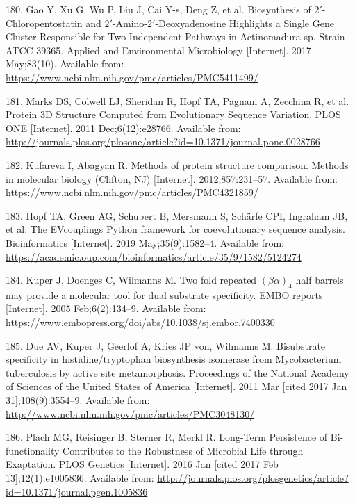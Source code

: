 \documentclass[12pt,twoside]{reedthesis}
\begin{document}
  \hypertarget{ref-gao_biosynthesis_2017}{}
  180. Gao Y, Xu G, Wu P, Liu J, Cai Y-s, Deng Z, et al. Biosynthesis of
  \(2\prime\)-Chloropentostatin and
  \(2\prime\)-Amino-\(2\prime\)-Deoxyadenosine Highlights a Single Gene
  Cluster Responsible for Two Independent Pathways in Actinomadura sp.
  Strain ATCC 39365. Applied and Environmental Microbiology
  {[}Internet{]}. 2017 May;83(10). Available from:
  \url{https://www.ncbi.nlm.nih.gov/pmc/articles/PMC5411499/}
  
  \hypertarget{ref-marks_protein_2011}{}
  181. Marks DS, Colwell LJ, Sheridan R, Hopf TA, Pagnani A, Zecchina R,
  et al. Protein 3D Structure Computed from Evolutionary Sequence
  Variation. PLOS ONE {[}Internet{]}. 2011 Dec;6(12):e28766. Available
  from:
  \url{http://journals.plos.org/plosone/article?id=10.1371/journal.pone.0028766}
  
  \hypertarget{ref-kufareva_methods_2012}{}
  182. Kufareva I, Abagyan R. Methods of protein structure comparison.
  Methods in molecular biology (Clifton, NJ) {[}Internet{]}.
  2012;857:231--57. Available from:
  \url{https://www.ncbi.nlm.nih.gov/pmc/articles/PMC4321859/}
  
  \hypertarget{ref-hopf_evcouplings_2019}{}
  183. Hopf TA, Green AG, Schubert B, Mersmann S, Schärfe CPI, Ingraham
  JB, et al. The EVcouplings Python framework for coevolutionary sequence
  analysis. Bioinformatics {[}Internet{]}. 2019 May;35(9):1582--4.
  Available from:
  \url{https://academic.oup.com/bioinformatics/article/35/9/1582/5124274}
  
  \hypertarget{ref-kuper_twofold_2005}{}
  184. Kuper J, Doenges C, Wilmanns M. Two fold repeated
  \((\beta\alpha)_4\) half barrels may provide a molecular tool for dual
  substrate specificity. EMBO reports {[}Internet{]}. 2005
  Feb;6(2):134--9. Available from:
  \url{https://www.embopress.org/doi/abs/10.1038/sj.embor.7400330}
  
  \hypertarget{ref-due_bisubstrate_2011}{}
  185. Due AV, Kuper J, Geerlof A, Kries JP von, Wilmanns M. Bisubstrate
  specificity in histidine/tryptophan biosynthesis isomerase from
  Mycobacterium tuberculosis by active site metamorphosis. Proceedings of
  the National Academy of Sciences of the United States of America
  {[}Internet{]}. 2011 Mar {[}cited 2017 Jan 31{]};108(9):3554--9.
  Available from:
  \url{http://www.ncbi.nlm.nih.gov/pmc/articles/PMC3048130/}
  
  \hypertarget{ref-plach_long-term_2016}{}
  186. Plach MG, Reisinger B, Sterner R, Merkl R. Long-Term Persistence of
  Bi-functionality Contributes to the Robustness of Microbial Life through
  Exaptation. PLOS Genetics {[}Internet{]}. 2016 Jan {[}cited 2017 Feb
  13{]};12(1):e1005836. Available from:
  \url{http://journals.plos.org/plosgenetics/article?id=10.1371/journal.pgen.1005836}
  
\end{document}
